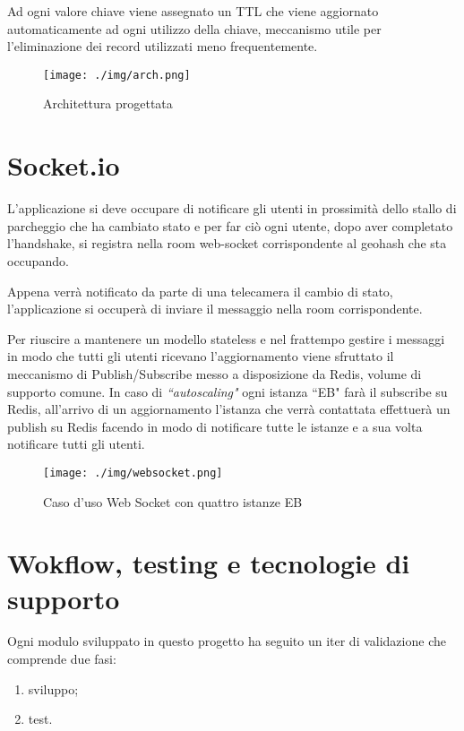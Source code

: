 Ad ogni valore chiave viene assegnato un TTL che viene aggiornato automaticamente ad ogni utilizzo della chiave, meccanismo utile per l'eliminazione dei record utilizzati meno frequentemente.
\begin{figure}[!htb]
	\centering
		\texttt{[image: ./img/arch.png]}
		\caption{Architettura progettata}

		
\end{figure}
\cleardoublepage
\section{Socket.io}
L'applicazione si deve occupare di notificare gli utenti in prossimità dello stallo di parcheggio che ha cambiato stato e per far ciò ogni utente, dopo aver completato l'handshake, si registra nella room web-socket corrispondente al geohash che sta occupando. 

Appena verrà notificato da parte di una telecamera il cambio di stato, l'applicazione si occuperà di inviare il messaggio nella room corrispondente. 

Per riuscire a mantenere un modello stateless e nel frattempo gestire i messaggi in modo che tutti gli utenti ricevano l'aggiornamento viene sfruttato il meccanismo di Publish/Subscribe messo a disposizione da Redis, volume di supporto comune. In caso di \textit{``autoscaling"} ogni istanza ``EB" farà il subscribe su Redis, all'arrivo di un aggiornamento l'istanza che verrà contattata effettuerà un publish su Redis facendo in modo di notificare tutte le istanze e a sua volta notificare tutti gli utenti.



\begin{figure}[!h]
	\centering 
		\texttt{[image: ./img/websocket.png]}
		\caption{Caso d'uso Web Socket con quattro istanze EB}
\end{figure}


\newpage
\section{Wokflow, testing e tecnologie di supporto}
Ogni modulo sviluppato in questo progetto ha seguito un iter di validazione che comprende due fasi:
\begin{enumerate}
	\item sviluppo;
	\item test.
\end{enumerate}

